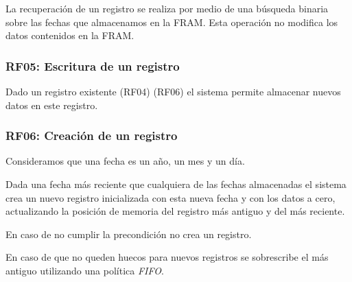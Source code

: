 La recuperación de un registro se realiza por medio de una búsqueda
binaria sobre las fechas que almacenamos en la FRAM.
Esta operación no modifica los datos contenidos en la FRAM.

\subsubsection{RF05: Escritura de un registro}

Dado un registro existente (RF04) (RF06) el sistema permite almacenar nuevos
datos en este registro.

\subsubsection{RF06: Creación de un registro}

Consideramos que una fecha es un año, un mes y un día.

Dada una fecha más reciente que cualquiera de las fechas almacenadas
el sistema crea un nuevo registro inicializada con esta nueva fecha
y con los datos a cero, actualizando la posición de memoria del registro
más antiguo y del más reciente.

En caso de no cumplir la precondición no crea un registro.

En caso de que no queden huecos para nuevos registros se sobrescribe
el más antiguo utilizando una política \textit{FIFO}.
